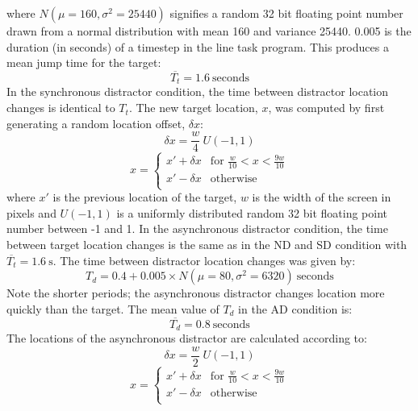 \documentclass[10pt,letterpaper]{article}
\begin{document}
%
where $N(\mu=160,\sigma^2=25440)$ signifies a random 32 bit floating
point number drawn from a normal distribution with mean 160 and
variance 25440. 0.005 is the duration (in seconds) of a timestep in
the line task program. This produces a mean jump time for the target:
\begin{equation}\label{eq:tau_target_mean}
  \overline{T_t} = 1.6~\text{seconds}
\end{equation}
In the synchronous distractor condition, the time between distractor
location changes is identical to $T_t$. The new target location, $x$,
was computed by first generating a random location offset,
${\delta}x$:
\begin{equation}\label{eq:rand_loc_offset_sync}
  {\delta}x = \frac{w}{4}~U(-1,1)
\end{equation}
\begin{equation}\label{eq:new_loc_sync}
  x=
  \begin{cases}
    x' + {\delta}x & \text{for }\frac{w}{10}<x<\frac{9w}{10}\\
    x' - {\delta}x & \text{otherwise}\\
  \end{cases}
\end{equation}
where $x'$ is the previous location of the target, $w$ is the width of
the screen in pixels and $U(-1,1)$ is a uniformly distributed random
32 bit floating point number between -1 and 1.
%
In the asynchronous distractor condition, the time between target
location changes is the same as in the ND and SD condition with
$\overline{T_t}=1.6~\text{s}$. The time between distractor location
changes was given by:
%
%
\begin{equation}\label{eq:tau_distractor_async}
  T_d = 0.4 + 0.005 \times N(\mu=80,\sigma^2=6320)~\text{seconds}
\end{equation}
Note the shorter periods; the asynchronous distractor changes location
more quickly than the target. The mean value of $T_d$ in the
AD condition is:
\begin{equation}\label{eq:tau_distractor_mean}
  \overline{T_d} = 0.8~\text{seconds}
\end{equation}
The locations of the asynchronous distractor are calculated according to:
\begin{equation}\label{eq:rand_loc_offset_async}
  {\delta}x = \frac{w}{2}~U(-1,1)
\end{equation}
\begin{equation}\label{eq:new_loc_async}
  x=
  \begin{cases}
    x' + {\delta}x & \text{for }\frac{w}{10}<x<\frac{9w}{10}\\
    x' - {\delta}x & \text{otherwise}\\
  \end{cases}
\end{equation}
\end{document}
